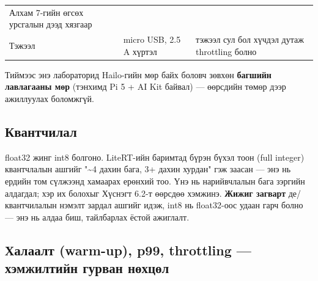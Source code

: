 \begin{longtable}[]{@{}lll@{}}
\begin{minipage}[t]{0.30\columnwidth}
Алхам 7-гийн өгсөх урсгалын дээд хязгаар\strut
\end{minipage}\tabularnewline
\begin{minipage}[t]{0.30\columnwidth}\raggedright
Тэжээл\strut
\end{minipage} & \begin{minipage}[t]{0.30\columnwidth}\raggedright
micro USB, 2.5 A хүртэл\strut
\end{minipage} & \begin{minipage}[t]{0.30\columnwidth}\raggedright
тэжээл сул бол хүчдэл дутаж throttling болно\strut
\end{minipage}\tabularnewline
\bottomrule
\end{longtable}\endgroup

Тиймээс энэ лабораторид Hailo-гийн мөр байх боловч зөвхөн \textbf{багшийн лавлагааны мөр} (тэнхимд Pi 5 + AI Kit байвал) --- өөрсдийн төмөр дээр ажиллуулах боломжгүй.

\hypertarget{ux43aux432ux430ux43dux442ux447ux438ux43bux430ux43b}{%
\subsection{Квантчилал}\label{ux43aux432ux430ux43dux442ux447ux438ux43bux430ux43b}}

float32 жинг int8 болгоно. LiteRT-ийн баримтад бүрэн бүхэл тоон (full integer) квантчлалын ашгийг "\textasciitilde4 дахин бага, 3+ дахин хурдан" гэж заасан --- энэ нь ердийн том сүлжээнд хамаарах ерөнхий тоо. Үнэ нь нарийвчлалын бага зэргийн алдагдал; хэр их болохыг Хүснэгт 6.2-т өөрсдөө хэмжинэ. \textbf{Жижиг загварт} де/квантчилалын нэмэлт зардал ашгийг идэж, int8 нь float32-оос удаан гарч болно --- энэ нь алдаа биш, тайлбарлах ёстой ажиглалт.

\hypertarget{ux445ux430ux43bux430ux430ux43bux442-warm-up-p99-throttling-ux445ux44dux43cux436ux438ux43bux442ux438ux439ux43d-ux433ux443ux440ux432ux430ux43d-ux43dux4e9ux445ux446ux4e9ux43b}{%
\subsection{Халаалт (warm-up), p99, throttling --- хэмжилтийн гурван нөхцөл}\label{ux445ux430ux43bux430ux430ux43bux442-warm-up-p99-throttling-ux445ux44dux43cux436ux438ux43bux442ux438ux439ux43d-ux433ux443ux440ux432ux430ux43d-ux43dux4e9ux445ux446ux4e9ux43b}}


